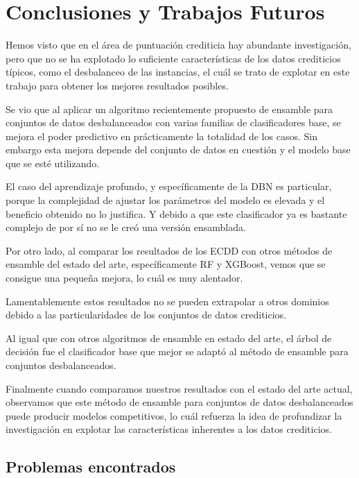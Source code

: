 \chapter{Conclusiones y Trabajos Futuros}\label{chap:conclusiones}


Hemos visto que en el área de puntuación crediticia hay abundante investigación, pero que no se ha explotado lo suficiente características de los datos crediticios típicos, como el desbalanceo de las instancias, el cuál se trato de explotar en este trabajo para obtener los mejores resultados posibles.

Se vio que al aplicar un algoritmo recientemente propuesto de ensamble para conjuntos de datos desbalanceados con varias familias de clasificadores base, se mejora el poder predictivo en prácticamente la totalidad de los casos. Sin embargo esta mejora depende del conjunto de datos en cuestión y el modelo base que se esté utilizando.

El caso del aprendizaje profundo, y específicamente de la \ac{DBN} es particular, porque la complejidad de ajustar los parámetros del modelo es elevada y el beneficio obtenido no lo justifica. Y debido a que este clasificador ya es bastante complejo de por sí no se le creó una versión ensamblada.

Por otro lado, al comparar los resultados de los \ac{ECDD} con otros métodos de ensamble del estado del arte, específicamente \ac{RF} y \ac{XGBoost}, vemos que se consigue una pequeña mejora, lo cuál es muy alentador.

Lamentablemente estos resultados no se pueden extrapolar a otros dominios debido a las particularidades de los conjuntos de datos crediticios.

Al igual que con otros algoritmos de ensamble en estado del arte, el árbol de decisión fue el clasificador base que mejor se adaptó al método de ensamble para conjuntos desbalanceados.

Finalmente cuando comparamos nuestros resultados con el estado del arte actual, observamos que este método de ensamble para conjuntos de datos desbalanceados puede producir modelos competitivos, lo cuál refuerza la idea de profundizar la investigación en explotar las características inherentes a los datos crediticios.

\section{Problemas encontrados}

